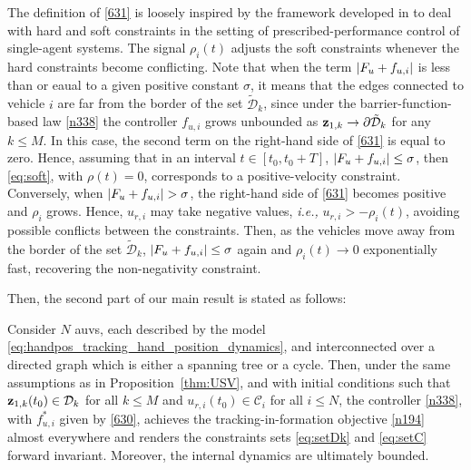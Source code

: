 \begin{rmk}
	The definition of \eqref{631} is loosely inspired by the framework developed in \cite{mehdifar2022funnel} to deal with hard and soft constraints in the setting of prescribed-performance control of single-agent systems.
	The signal $\rho_i(t)$ adjusts the soft constraints whenever the hard constraints become conflicting. 
	Note that when the term $\left|F_{u}+f_{u, i}\right|$ is less than or eaual to a given positive constant $\sigma$, it means that the edges connected to vehicle $i$ are far from the border of the set $\tilde{\mathcal{D}}_k$, since under the barrier-function-based law \eqref{n338} the controller $f_{u, i}$ grows unbounded as $\mathbf{z}_{1, k}\rightarrow\partial\tilde{\mathcal{D}}_k$ for any $k\leq M$.
	In this case, the second term on the right-hand side of \eqref{631} is equal to zero. Hence, assuming that in an interval $t\in[t_0,t_0+T]$, $\left|F_{u}+f_{u, i}\right|\leq \sigma$, then \eqref{eq:soft}, with $\rho(t)=0$, corresponds to a positive-velocity constraint.
	Conversely, when $\abs{F_{u}+f_{u, i}}>\sigma$, the right-hand side of \eqref{631} becomes positive and $\rho_i$ grows. Hence, $u_{r, i}$ may take negative values, \emph{i.e.,} $u_{r, i}>-\rho_i(t)$, avoiding possible conflicts between the constraints. Then, as the vehicles move away from the border of the set $\tilde{\mathcal{D}}_k$, $\left|F_{u}+f_{u, i}\right|\leq\sigma$ again and $\rho_i(t)\rightarrow0$ exponentially fast, recovering the non-negativity constraint.
\end{rmk}

Then, the second part of our main result is stated as follows:
\begin{prop}\label{thm:USV-2}
	Consider $N$ \glspl{auv}, each described by the model \eqref{eq:handpos_tracking_hand_position_dynamics}, and interconnected over a directed graph which is either a spanning tree or a cycle.
	Then, under the same assumptions as in Proposition~\ref{thm:USV}, and with initial conditions such that $\mathbf{z}_{1, k}(t_0)\in\mathcal{D}_k$ for all $k\leq M$ and $u_{r, i}(t_0)\in\mathcal{C}_i$ for all $i\leq N$, the controller \eqref{n338}, with $f_{u, i}^*$ given by \eqref{630}, achieves the tracking-in-formation objective \eqref{n194} almost everywhere and renders the constraints sets \eqref{eq:setDk} and \eqref{eq:setC} forward invariant.
	Moreover, the internal dynamics are ultimately bounded.
\end{prop}

